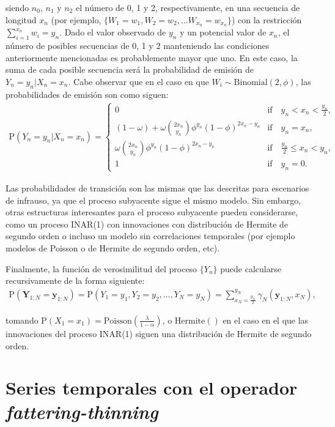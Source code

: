 \documentclass[12pt,twoside]{article} %
\begin{document}
\noindent siendo $n_0$, $n_1$ y $n_2$ el número de 0, 1 y 2, respectivamente, en una secuencia de longitud $x_n$ (por ejemplo, $\{W_1=w_1, W_2=w_2, \dots W_{x_n}=w_{x_n}\}$) con la restricción $\sum_{i=1}^{x_n}w_i=y_n$. Dado el valor observado de $y_n$ y un potencial valor de $x_n$, el número de posibles secuencias de 0, 1 y 2 manteniendo las condiciones anteriormente mencionadas es probablemente mayor que uno. En este caso, la suma de cada posible secuencia será la probabilidad de emisión de $Y_n=y_n|X_n=x_n$. Cabe observar que en el caso en que $W_i \sim \textrm{Binomial}(2,\phi)$, las probabilidades de emisión son como siguen:
 \begin{align}
\textrm{P}(Y_n=y_n|X_n=x_n)=\begin{cases} 
0 &  \textrm{if} \quad y_n<x_n<\frac{y_n}{2} , \\
(1-\omega)+\omega \binom{2x_n}{y_n}\phi^{y_n}(1-\phi)^{2x_n-y_n}&  \textrm{if} \quad y_n=x_n , \\
\omega \binom{2x_n}{y_n}\phi^{y_n}(1-\phi)^{2x_n-y_n} &  \textrm{if} \quad  \frac{y_n}{2}\leq x_n <y_n, \\
1 & \textrm{if} \quad  y_n=0.
\end{cases}
\end{align}

\noindent Las probabilidades de transición son las mismas que las descritas para escenarios de infrauso, ya que el proceso subyacente sigue el mismo modelo. Sin embargo, otras estructuras interesantes para el proceso subyacente pueden considerarse, como un proceso INAR(1) con innovaciones con distribución de Hermite de segundo orden o incluso un modelo sin correlaciones temporales (por ejemplo modelos de Poisson o de Hermite de segundo orden, etc).

\noindent Finalmente, la función de verosimilitud del proceso $\{Y_n\}$ puede calcularse recursivamente de la forma siguiente:
\begin{align}
\label{for:LF}
\textrm{P}(\boldsymbol{Y}_{1:N}=\boldsymbol{y}_{1:N})=\textrm{P}\left(Y_1=y_1,Y_2=y_2,\dots,Y_N=y_N\right)=\sum_{x_N=\frac{y_N}{2}}^{y_N}\gamma_N\left(\boldsymbol{y}_{1:N},x_N\right),
\end{align}

\noindent tomando $\textrm{P}(X_1=x_1)=\textrm{Poisson}(\frac{\lambda}{1-\alpha})$, o $\textrm{Hermite}()$ en el caso en el que las innovaciones del proceso INAR(1) siguen una distribución de Hermite de segundo orden. 

\section{Series temporales con el operador \textit{fattering-thinning}}
\end{document}
